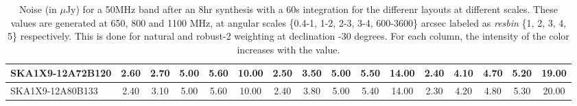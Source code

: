 \begin{table}[htp]
{{\begin{tabular}{|lccccc||ccccc||ccccc|}
SKA1X9-12A72B120 & 2.60 \cellcolor{blue!32.00} & 2.70 \cellcolor{red!30.00} & 5.00 \cellcolor{green!60.00} & 5.60 \cellcolor{orange!60.00} & 10.00 \cellcolor{purple!21.82} & 2.50 \cellcolor{blue!25.00} & 3.50 \cellcolor{red!48.80} & 5.00 \cellcolor{green!60.00} & 5.50 \cellcolor{orange!60.00} & 14.00 \cellcolor{purple!60.00} & 2.40 \cellcolor{blue!23.25} & 4.10 \cellcolor{red!54.75} & 4.70 \cellcolor{green!53.00} & 5.20 \cellcolor{orange!54.75} & 19.00 \cellcolor{purple!39.00}\\ \hline 
SKA1X9-12A80B133 & 2.40 \cellcolor{blue!18.00} & 3.10 \cellcolor{red!42.00} & 5.00 \cellcolor{green!60.00} & 5.60 \cellcolor{orange!60.00} & 10.00 \cellcolor{purple!21.82} & 2.40 \cellcolor{blue!18.00} & 3.80 \cellcolor{red!57.20} & 5.00 \cellcolor{green!60.00} & 5.40 \cellcolor{orange!54.00} & 14.00 \cellcolor{purple!60.00} & 2.30 \cellcolor{blue!18.00} & 4.20 \cellcolor{red!60.00} & 4.80 \cellcolor{green!60.00} & 5.30 \cellcolor{orange!60.00} & 20.00 \cellcolor{purple!60.00}\\ \hline 
\end{tabular}}
\vspace{-0.300000cm}
\hspace{1cm} 

\vspace{.25cm}
\caption{Noise (in $\mu$Jy) for a 50MHz band after an 8hr synthesis with a 60s integration for the differenr layouts at different scales. These values are generated at 650, 800 and 1100 MHz, at angular scales \{0.4-1, 1-2, 2-3, 3-4, 600-3600\} arcsec labeled as {\it resbin} \{1, 2, 3, 4, 5\} respectively. This is done for natural and robust-2 weighting at declination -30 degrees. For each column, the intensity of the color increases with the value.}\label{tab:noise50}}
 \end{table}
